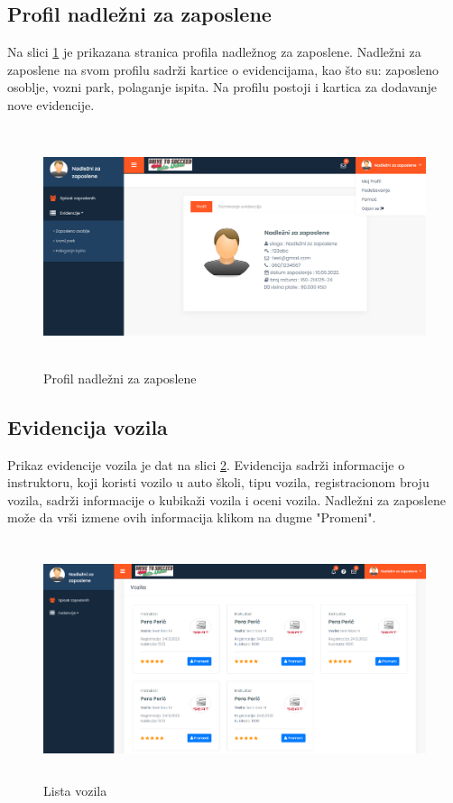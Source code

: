 \subsection{Profil nadležni za zaposlene}

Na slici  \ref{fig:ui_nadlezni} je prikazana stranica profila nadležnog za zaposlene. 
Nadležni za zaposlene na svom profilu sadrži kartice o evidencijama, kao što su: zaposleno osoblje, vozni park, polaganje ispita. 
Na profilu postoji i kartica za dodavanje nove evidencije.

\begin{figure}[H]
  \begin{center}
      \includegraphics[width=140mm, height=70mm]{UI/UI_nadlezni_za_zaposlene.png}
  \end{center}
  \caption {Profil nadležni za zaposlene}
  \label{fig:ui_nadlezni}

\end{figure}

\subsection{Evidencija vozila}

Prikaz evidencije vozila je dat na slici \ref{fig:ui_vozila}. 
Evidencija sadrži informacije o instruktoru, koji koristi vozilo u auto školi, tipu vozila, registracionom broju vozila, sadrži informacije o kubikaži vozila i oceni vozila. 
Nadležni za zaposlene može da vrši izmene ovih informacija klikom na dugme "Promeni".



\begin{figure}[H]
  \begin{center}
      \includegraphics[width=140mm, height=70mm]{UI/UI_Nadlezni_za_zaposlene_vozila.png}
  \end{center}
  \caption {Lista vozila}
  \label{fig:ui_vozila}

\end{figure}
